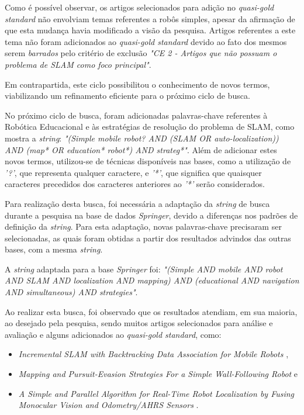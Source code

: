 		Como é possível observar, os artigos selecionados para adição no \textit{quasi-gold standard} não envolviam temas referentes a robôs simples, apesar da afirmação de que esta mudança havia modificado a visão da pesquisa. Artigos referentes a este tema não foram adicionados ao \textit{quasi-gold standard} devido ao fato dos mesmos serem \textit{barrados} pelo critério de exclusão \textit{"CE 2 - Artigos que não possuam o problema de SLAM como foco principal"}. 

		Em contrapartida, este ciclo possibilitou o conhecimento de novos termos, viabilizando um refinamento eficiente para o próximo ciclo de busca.

		No próximo ciclo de busca, foram adicionadas palavras-chave referentes à Robótica Educacional e às estratégias de resolução do problema de SLAM, como mostra a \textit{string}: \textit{"(Simple mobile robot? AND (SLAM OR auto-localization)) AND (map* OR education* robot*) AND strateg*"}. Além de adicionar estes novos termos, utilizou-se de técnicas disponíveis nas bases, como a utilização de \textit{'?'}, que representa qualquer caractere, e \textit{'*'}, que significa que quaisquer caracteres precedidos dos caracteres anteriores ao \textit{'*'} serão considerados.

		Para realização desta busca, foi necessária a adaptação da \textit{string} de busca durante a pesquisa na base de dados \textit{Springer}, devido a diferenças nos padrões de definição da \textit{string}. Para esta adaptação, novas palavras-chave precisaram ser selecionadas, as quais foram obtidas a partir dos resultados advindos das outras bases, com a mesma \textit{string}.

		A \textit{string} adaptada para a base \textit{Springer} foi: \textit{"(Simple AND mobile AND robot AND SLAM AND localization AND mapping) AND (educational AND navigation AND simultaneous) AND strategies"}.

		Ao realizar esta busca, foi observado que os resultados atendiam, em sua maioria, ao desejado pela pesquisa, sendo muitos artigos selecionados para análise e avaliação e alguns adicionados ao \textit{quasi-gold standard}, como:

			\begin{itemize}
				\item \textit{Incremental SLAM with Backtracking Data Association for Mobile Robots} \cite{incrementalSLAM},
				\item \textit{Mapping and Pursuit-Evasion Strategies For a Simple Wall-Following Robot} \cite{wall_following} e
				\item \textit{A Simple and Parallel Algorithm for Real-Time Robot Localization by Fusing Monocular Vision and Odometry/AHRS Sensors} \cite{fusingSensorsParallel}.
			\end{itemize}

